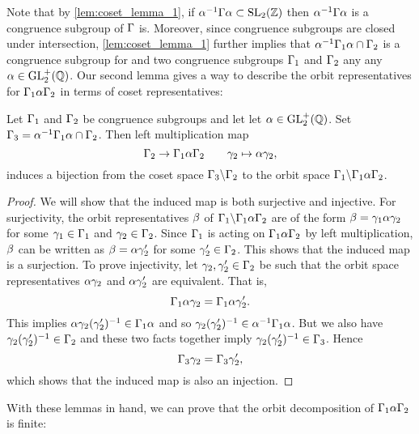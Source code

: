       Note that by \cref{lem:coset_lemma_1}, if $\alpha^{-1}\Gamma\alpha \subset \mathrm{SL}_{2}(\mathbb{Z})$ then $\alpha^{-1}\Gamma\alpha$ is a congruence subgroup of $\Gamma$ is. Moreover, since congruence subgroups are closed under intersection, \cref{lem:coset_lemma_1} further implies that $\alpha^{-1}\Gamma_{1}\alpha \cap \Gamma_{2}$ is a congruence subgroup for and two congruence subgroups $\Gamma_{1}$ and $\Gamma_{2}$ any any $\alpha \in \mathrm{GL}_{2}^{+}(\mathbb{Q})$. Our second lemma gives a way to describe the orbit representatives for $\Gamma_{1}\alpha\Gamma_{2}$ in terms of coset representatives:

      \begin{lemma}\label{lem:coset_lemma_2}
        Let $\Gamma_{1}$ and $\Gamma_{2}$ be congruence subgroups and let let $\alpha \in \mathrm{GL}_{2}^{+}(\mathbb{Q})$. Set $\Gamma_{3} = \alpha^{-1}\Gamma_{1}\alpha \cap \Gamma_{2}$. Then left multiplication map
        \[
          \Gamma_{2} \to \Gamma_{1}\alpha\Gamma_{2} \qquad \gamma_{2} \mapsto \alpha\gamma_{2},
        \]
        induces a bijection from the coset space $\Gamma_{3}\backslash\Gamma_{2}$ to the orbit space $\Gamma_{1}\backslash\Gamma_{1}\alpha\Gamma_{2}$.
      \end{lemma}
      \begin{proof}
        We will show that the induced map is both surjective and injective. For surjectivity, the orbit representatives $\beta$ of $\Gamma_{1}\backslash\Gamma_{1}\alpha\Gamma_{2}$ are of the form $\beta = \gamma_{1}\alpha\gamma_{2}$ for some $\gamma_{1} \in \Gamma_{1}$ and $\gamma_{2} \in \Gamma_{2}$. Since $\Gamma_{1}$ is acting on $\Gamma_{1}\alpha\Gamma_{2}$ by left multiplication, $\beta$ can be written as $\beta = \alpha\gamma'_{2}$ for some $\gamma'_{2} \in \Gamma_{2}$. This shows that the induced map is a surjection. To prove injectivity, let $\gamma_{2},\gamma'_{2} \in \Gamma_{2}$ be such that the orbit space representatives $\alpha\gamma_{2}$ and $\alpha\gamma'_{2}$ are equivalent. That is,
        \[
          \Gamma_{1}\alpha\gamma_{2} = \Gamma_{1}\alpha\gamma'_{2}.
        \]
        This implies $\alpha\gamma_{2}(\gamma'_{2})^{-1} \in \Gamma_{1}\alpha$ and so $\gamma_{2}(\gamma'_{2})^{-1} \in \alpha^{-1}\Gamma_{1}\alpha$. But we also have $\gamma_{2}(\gamma'_{2})^{-1} \in \Gamma_{2}$ and these two facts together imply $\gamma_{2}(\gamma'_{2})^{-1} \in \Gamma_{3}$. Hence
        \[
          \Gamma_{3}\gamma_{2} = \Gamma_{3}\gamma'_{2},
        \]
        which shows that the induced map is also an injection.
      \end{proof}

      With these lemmas in hand, we can prove that the orbit decomposition of $\Gamma_{1}\alpha\Gamma_{2}$ is finite:

